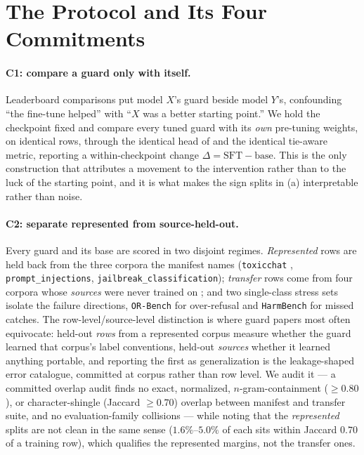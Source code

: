 \documentclass[manuscript,screen,review,anonymous]{acmart}
\newcommand{\code}[1]{\texttt{\small #1}}
\begin{document}
\section{The Protocol and Its Four Commitments}
\label{sec:protocol}

\paragraph{C1: compare a guard only with itself.} Leaderboard comparisons put model $X$'s guard beside
model $Y$'s, confounding ``the fine-tune helped'' with ``$X$ was a better starting point.'' We hold the
checkpoint fixed and compare every tuned guard with its \emph{own} pre-tuning weights, on identical
rows, through the identical head of  and the identical tie-aware metric, reporting a
within-checkpoint change $\Delta = \mathrm{SFT}-\mathrm{base}$. This is the only construction that
attributes a movement to the intervention rather than to the luck of the starting point, and it is what
makes the sign splits in (a) interpretable rather than noise.

\paragraph{C2: separate represented from source-held-out.}\leavevmode\newline Every guard and its base are scored in two
disjoint regimes. \emph{Represented} rows are held back from the three corpora the manifest names
(\code{toxicchat} \citep{lin2023toxicchat}, \code{prompt\_injections},
\code{jailbreak\_classification}); \emph{transfer} rows come from four corpora whose \emph{sources} were
never trained on \citep{chao2024jailbreakbench,rottger2024xstest,han2024wildguard,jiang2024wildteaming};
and two single-class stress sets isolate the failure directions, \code{OR-Bench}
\citep{cui2024orbench} for over-refusal and \code{HarmBench} \citep{mazeika2024harmbench} for missed
catches. The row-level/source-level distinction is where guard papers most often equivocate: held-out
\emph{rows} from a represented corpus measure whether the guard learned that corpus's label conventions,
held-out \emph{sources} whether it learned anything portable, and reporting the first as generalization
is the leakage-shaped error \citet{kapoor2023leakage} catalogue, committed at corpus rather than row
level. We audit it --- a committed overlap audit finds no exact, normalized, $n$-gram-containment
($\geq0.80$), or character-shingle (Jaccard $\geq0.70$) overlap between manifest and transfer suite, and
no evaluation-family collisions --- while noting that the \emph{represented} splits are not clean in the
same sense ($1.6\%$--$5.0\%$ of each sits within Jaccard $0.70$ of a training row), which qualifies the
represented margins, not the transfer ones.
\end{document}
